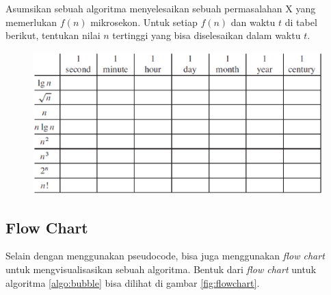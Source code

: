 
\begin{konsep}
Asumsikan sebuah algoritma menyelesaikan sebuah permasalahan X yang memerlukan $f(n)$ mikrosekon. Untuk setiap $f(n)$ dan waktu $t$ di tabel berikut, tentukan nilai $n$ tertinggi yang bisa diselesaikan dalam waktu $t$.
\begin{figure}%
\centering
\includegraphics[scale=0.5]{fig/tableEksekusi.eps}%
\end{figure}
\end{konsep}

\subsection{Flow Chart}
Selain dengan menggunakan pseudocode, bisa juga menggunakan \textit{flow chart} untuk mengvisualisasikan sebuah algoritma. Bentuk dari \textit{flow chart} untuk algoritma \ref{algo:bubble} bisa dilihat di gambar \ref{fig:flowchart}.

